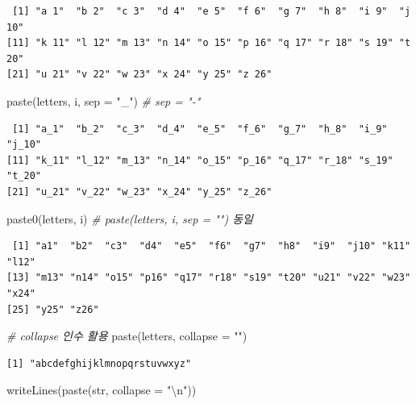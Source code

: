 \documentclass[
  11pt,
]{krantz}
\newenvironment{Shaded}{\begin{snugshade}}{\end{snugshade}}
\newcommand{\AttributeTok}[1]{\textcolor[rgb]{0.61,0.61,0.61}{#1}}
\newcommand{\CommentTok}[1]{\textcolor[rgb]{0.37,0.37,0.37}{\textit{#1}}}
\newcommand{\FunctionTok}[1]{\textcolor[rgb]{0,0,0}{#1}}
\newcommand{\NormalTok}[1]{#1}
\newcommand{\SpecialCharTok}[1]{\textcolor[rgb]{0,0,0}{#1}}
\newcommand{\StringTok}[1]{\textcolor[rgb]{0.5,0.5,0.5}{#1}}
\begin{document}
\begin{verbatim}
 [1] "a 1"  "b 2"  "c 3"  "d 4"  "e 5"  "f 6"  "g 7"  "h 8"  "i 9"  "j 10"
[11] "k 11" "l 12" "m 13" "n 14" "o 15" "p 16" "q 17" "r 18" "s 19" "t 20"
[21] "u 21" "v 22" "w 23" "x 24" "y 25" "z 26"
\end{verbatim}

\begin{Shaded}
\begin{Highlighting}[]
\FunctionTok{paste}\NormalTok{(letters, i, }\AttributeTok{sep =} \StringTok{"\_"}\NormalTok{) }\CommentTok{\# sep = "{-}"}
\end{Highlighting}
\end{Shaded}

\begin{verbatim}
 [1] "a_1"  "b_2"  "c_3"  "d_4"  "e_5"  "f_6"  "g_7"  "h_8"  "i_9"  "j_10"
[11] "k_11" "l_12" "m_13" "n_14" "o_15" "p_16" "q_17" "r_18" "s_19" "t_20"
[21] "u_21" "v_22" "w_23" "x_24" "y_25" "z_26"
\end{verbatim}

\begin{Shaded}
\begin{Highlighting}[]
\FunctionTok{paste0}\NormalTok{(letters, i) }\CommentTok{\# paste(letters, i, sep = "") 동일}
\end{Highlighting}
\end{Shaded}

\begin{verbatim}
 [1] "a1"  "b2"  "c3"  "d4"  "e5"  "f6"  "g7"  "h8"  "i9"  "j10" "k11" "l12"
[13] "m13" "n14" "o15" "p16" "q17" "r18" "s19" "t20" "u21" "v22" "w23" "x24"
[25] "y25" "z26"
\end{verbatim}

\begin{Shaded}
\begin{Highlighting}[]
\CommentTok{\# collapse 인수 활용}
\FunctionTok{paste}\NormalTok{(letters, }\AttributeTok{collapse =} \StringTok{""}\NormalTok{)}
\end{Highlighting}
\end{Shaded}

\begin{verbatim}
[1] "abcdefghijklmnopqrstuvwxyz"
\end{verbatim}

\begin{Shaded}
\begin{Highlighting}[]
\FunctionTok{writeLines}\NormalTok{(}\FunctionTok{paste}\NormalTok{(str, }\AttributeTok{collapse =} \StringTok{"}\SpecialCharTok{\textbackslash{}n}\StringTok{"}\NormalTok{))}
\end{Highlighting}
\end{Shaded}
\end{document}
